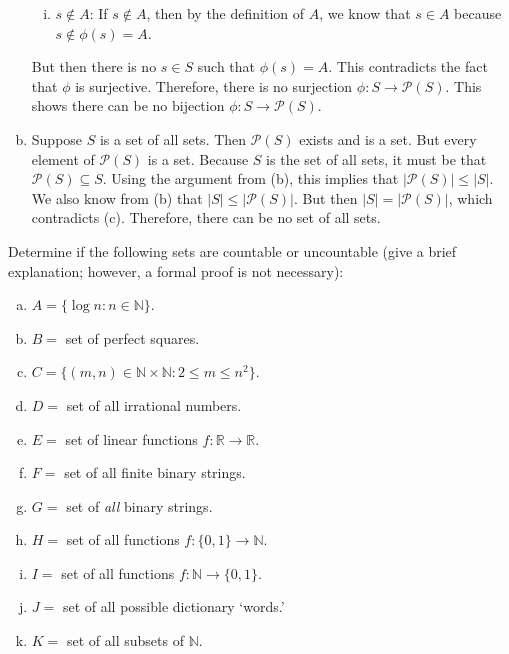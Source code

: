 \documentclass[11pt,letterpaper]{article}
\begin{document}
\begin{enumerate}[(a)]
\begin{enumerate}[(i)]
	\item $s \notin A$: If $s \notin A$, then by the definition of $A$, we know that $s \in A$ because $s \notin \phi(s)= A$. 
	\end{enumerate}
But then there is no $s \in S$ such that $\phi(s)= A$. This contradicts the fact that $\phi$ is surjective. Therefore, there is no surjection $\phi: S \to \mathcal{P}(S)$. This shows there can be no bijection $\phi: S \to \mathcal{P}(S)$. \pspace

\item Suppose $S$ is a set of all sets. Then $\mathcal{P}(S)$ exists and is a set. But every element of $\mathcal{P}(S)$ is a set. Because $S$ is the set of all sets, it must be that $\mathcal{P}(S) \subseteq S$. Using the argument from (b), this implies that $|\mathcal{P}(S)| \leq |S|$. We also know from (b) that $|S| \leq |\mathcal{P}(S)|$. But then $|S|= |\mathcal{P}(S)|$, which contradicts (c). Therefore, there can be no set of all sets. 
\end{enumerate}



\newpage



 Determine if the following sets are countable or uncountable (give a brief explanation; however, a formal proof is not necessary):
\begin{enumerate}[(a)]
\item $A= \{ \log n \colon n \in \mathbb{N} \}$.
\item $B=$ set of perfect squares. 
\item $C= \{ (m, n) \in \mathbb{N} \times \mathbb{N} \colon 2 \leq m \leq n^2 \}$.
\item $D=$ set of all irrational numbers. 
\item $E=$ set of linear functions $f: \mathbb{R} \to \mathbb{R}$.
\item $F=$ set of all finite binary strings. 
\item $G=$ set of {\itshape all} binary strings. 
\item $H=$ set of all functions $f: \{ 0 , 1 \} \to \mathbb{N}$. 
\item $I=$ set of all functions $f: \mathbb{N} \to \{ 0, 1 \}$. 
\item $J=$ set of all possible dictionary `words.' 
\item $K=$ set of all subsets of $\mathbb{N}$.
\end{enumerate} \pspace
\end{document}
